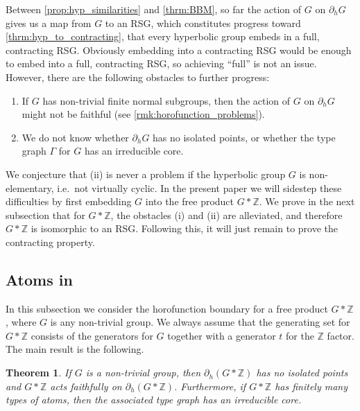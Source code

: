 \documentclass[11pt,letterpaper]{amsart}
\newtheorem{theorem}{Theorem}[section]
\theoremstyle{definition}
\newcommand{\Z}{\mathbb{Z}}
\newlength\bshft
\def\fakebold#1{\ThisStyle{\ooalign{$\SavedStyle#1$\cr%
  \kern-\bshft$\SavedStyle#1$\cr%
  \kern\bshft$\SavedStyle#1$}}}
\begin{document}
Between \cref{prop:hyp_similarities} and \cref{thrm:BBM}, so far the action of $G$ on $\partial_h G$ gives us a map from $G$ to an RSG, which constitutes progress toward \cref{thrm:hyp_to_contracting}, that every hyperbolic group embeds in a full, contracting RSG. Obviously embedding into a contracting RSG would be enough to embed into a full, contracting RSG, so achieving ``full'' is not an issue. However, there are the following obstacles to further progress:
\begin{enumerate}
    \item If $G$ has non-trivial finite normal subgroups, then the action of $G$ on $\partial_h G$ might not be faithful (see \cref{rmk:horofunction_problems}).\smallskip
    \item We do not know whether $\partial_h G$ has no isolated points, or whether the type graph $\Gamma$ for $G$ has an irreducible core.
\end{enumerate}
We conjecture that (ii) is never a problem if the hyperbolic group $G$ is non-elementary, i.e.\ not virtually cyclic.  In the present paper we will sidestep these difficulties by first embedding $G$ into the free product $G*\Z$.  We prove in the next subsection that for $G*\Z$, the obstacles (i) and (ii) are alleviated, and therefore $G*\Z$ is isomorphic to an RSG. Following this, it will just remain to prove the contracting property.


\subsection{Atoms in \texorpdfstring{\except{toc}{$G*{\protect\fakebold{\Z}}$}\except{here}{$G*\Z$}}{G * Z}}\label{ssec:free_Z_factor}

In this subsection we consider the horofunction boundary for a free product $G*\Z$, where $G$ is any non-trivial group.  We always assume that the generating set for $G*\Z$ consists of the generators for $G$ together with a generator $t$ for the $\Z$ factor.  The main result is the following.

\begin{theorem}\label{thrm:FreeProductBoundary}
If $G$ is a non-trivial group, then $\partial_h(G*\Z)$ has no isolated points and $G*\Z$ acts faithfully on $\partial_h(G*\Z)$.  Furthermore, if $G*\Z$ has finitely many types of atoms, then the associated type graph has an irreducible core.
\end{theorem}
\end{document}
